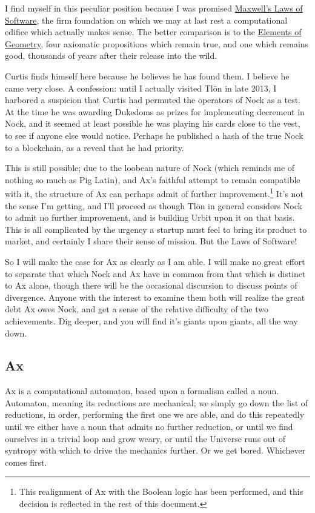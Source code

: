 \documentclass[twoside]{article}
\begin{document}
I find myself in this peculiar position because I was promised \href{https://moronlab.blogspot.com/}{Maxwell's Laws of Software}, the firm foundation on which we may at last rest a computational edifice which actually makes sense. The better comparison is to the \href{https://en.wikipedia.org/wiki/Euclid%27s_Elements}{Elements of Geometry}, four axiomatic propositions which remain true, and one which remains good, thousands of years after their release into the wild.

Curtis finds himself here because he believes he has found them. I believe he came very close. A confession: until I actually visited Tlön in late 2013, I harbored a suspicion that Curtis had permuted the operators of Nock as a test. At the time he was awarding Dukedoms as prizes for implementing decrement in Nock, and it seemed at least possible he was playing his cards close to the vest, to see if anyone else would notice. Perhaps he published a hash of the true Nock to a blockchain, as a reveal that he had priority.

This is still possible; due to the loobean nature of Nock (which reminds me of nothing so much as Pig Latin), and Ax's faithful attempt to remain compatible with it, the structure of Ax can perhaps admit of further improvement.\footnote{This realignment of Ax with the Boolean logic has been performed, and this decision is reflected in the rest of this document.} It's not the sense I'm getting, and I'll proceed as though Tlön in general considers Nock to admit no further improvement, and is building Urbit upon it on that basis. This is all complicated by the urgency a startup must feel to bring its product to market, and certainly I share their sense of mission. But the Laws of Software!

So I will make the case for Ax as clearly as I am able. I will make no great effort to separate that which Nock and Ax have in common from that which is distinct to Ax alone, though there will be the occasional discursion to discuss points of divergence. Anyone with the interest to examine them both will realize the great debt Ax owes Nock, and get a sense of the relative difficulty of the two achievements. Dig deeper, and you will find it's giants upon giants, all the way down.

\subsection{Ax}

Ax is a computational automaton, based upon a formalism called a noun. Automaton, meaning its reductions are mechanical; we simply go down the list of reductions, in order, performing the first one we are able, and do this repeatedly until we either have a noun that admits no further reduction, or until we find ourselves in a trivial loop and grow weary, or until the Universe runs out of syntropy with which to drive the mechanics further. Or we get bored. Whichever comes first.
\end{document}
